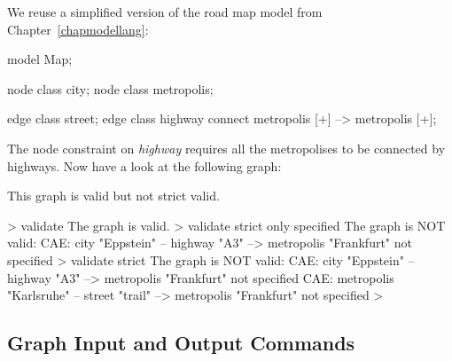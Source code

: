 \begin{example}
We reuse a simplified version of the road map model from Chapter~\ref{chapmodellang}:
\begin{grgen} 
model Map;

node class city;
node class metropolis;

edge class street;
edge class highway
      connect metropolis [+] --> metropolis [+];
\end{grgen}
The node constraint on \emph{highway} requires all the metropolises to be connected by highways. Now have a look at the following graph:
\begin{center}
\end{center}

This graph is valid but not strict valid.
\begin{grshell} 
> validate
The graph is valid.
> validate strict only specified
The graph is NOT valid:
  CAE: city "Eppstein" -- highway "A3" --> metropolis "Frankfurt" not specified
> validate strict
The graph is NOT valid:
  CAE: city "Eppstein" -- highway "A3" --> metropolis "Frankfurt" not specified
  CAE: metropolis "Karlsruhe" -- street "trail" --> metropolis "Frankfurt" not specified
>
\end{grshell}
\end{example}


\pagebreak

\subsection{Graph Input and Output Commands}
\label{outputcmds}

